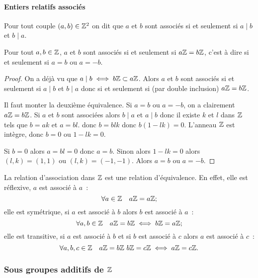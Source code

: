 \paragraph{Entiers relatifs associés}

\begin{defdef}
  Pour tout couple \((a,b) \in \mathbb{Z}^2\) on dit que \(a\) et \(b\) sont associés si et seulement si \(a\mid b\) et \(b\mid a\).
\end{defdef}
\begin{prop}
  Pour tout \(a,b \in \mathbb{Z}\), \(a\) et \(b\) sont associés si et seulement si \(a\mathbb{Z}=b\mathbb{Z}\), c'est à dire si et seulement si \(a=b\) ou \(a=-b\).
\end{prop}
\begin{proof}
  On a déjà vu que \(a\mid b \iff b\mathbb{Z} \subset a\mathbb{Z}\). Alors \(a\) et \(b\) sont associés si et seulement si \(a\mid b\) et \(b\mid a\) donc si et seulement si (par double inclusion) \(a\mathbb{Z}=b\mathbb{Z}\).

  Il faut monter la deuxième équivalence. Si \(a=b\) ou \(a=-b\), on a clairement \(a\mathbb{Z}=b\mathbb{Z}\). Si \(a\) et \(b\) sont associées alors \(b\mid a\) et \(a\mid b\) donc il existe \(k\) et \(l\) dans \(\mathbb{Z}\) tels que \(b=ak\) et \(a=bl\). donc \(b=blk\) donc \(b(1-lk)=0\). L'anneau \(\mathbb{Z}\) est intègre, donc \(b=0\) ou \(1-lk=0\).

  Si \(b=0\) alors \(a=bl=0\) donc \(a=b\). Sinon alors \(1-lk=0\) alors \((l,k)=(1,1)\) ou \((l,k)=(-1,-1)\). Alors \(a=b\) ou \(a=-b\).
\end{proof}

La relation d'association dans \(\mathbb{Z}\) est une relation d'équivalence. En effet, elle est réflexive, \(a\) est associé à \(a\)~:
\begin{equation}
  \forall a \in \mathbb{Z} \quad a\mathbb{Z}=a\mathbb{Z};
\end{equation}
elle est symétrique, si \(a\) est associé à \(b\) alors \(b\) est associé à \(a\)~:
\begin{equation}
  \forall a,b \in \mathbb{Z} \quad a\mathbb{Z}=b\mathbb{Z} \iff b\mathbb{Z}=a\mathbb{Z};
\end{equation}
elle est transitive, si \(a\) est associé à \(b\) et si \(b\) est associé à \(c\) alors \(a\) est associé à \(c\)~:
\begin{equation}
  \forall a,b,c \in \Z \quad a\Z=b\Z \ b\Z=c\Z \iff a\Z=c\Z.
\end{equation}

\subsubsection{Sous groupes additifs de \(\mathbb{Z}\)}

